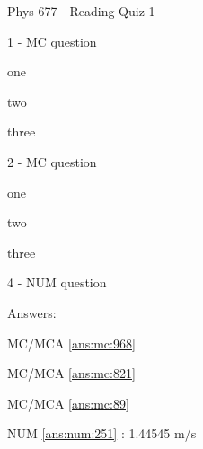\documentclass[letterpaper,10pt]{article}
\begin{document}
\begin{center}
{\Large Phys 677 - Reading Quiz 1}
\end{center}


\begin{compactenum}
    \begin{minipage}{\linewidth}
    \item 1 - MC question
    \begin{compactenum}
        \item \label{ans:mc:968}one
        \item two
        \item three
    \end{compactenum}

    \end{minipage}

    \vspace{10pt}

    \begin{minipage}{\linewidth}
    \item 2 - MC question
    \begin{compactenum}
        \item one
        \item \label{ans:mc:821}two
        \item \label{ans:mc:89}three
    \end{compactenum}

    \end{minipage}

    \vspace{10pt}

    \begin{minipage}{\linewidth}
    \item 4 - NUM question

    \label{ans:num:251}

    \end{minipage}

    \vspace{10pt}

\end{compactenum}

\clearpage
Answers:

  MC/MCA \ref{ans:mc:968}

  MC/MCA \ref{ans:mc:821}

  MC/MCA \ref{ans:mc:89}

  NUM \ref{ans:num:251} : 1.44545 m/s
\end{document}
